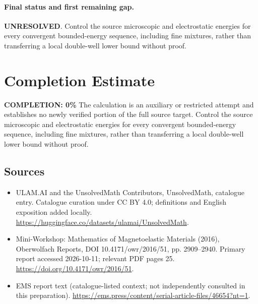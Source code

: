 \documentclass[11pt]{article}
\begin{document}
\paragraph{Final status and first remaining gap.}
\textbf{UNRESOLVED}. Control the source microscopic and electrostatic energies for every convergent bounded-energy sequence, including fine mixtures, rather than transferring a local double-well lower bound without proof.

\section{Completion Estimate}
\noindent\textbf{COMPLETION: 0\%}
The calculation is an auxiliary or restricted attempt and establishes no newly verified portion of the full source target. Control the source microscopic and electrostatic energies for every convergent bounded-energy sequence, including fine mixtures, rather than transferring a local double-well lower bound without proof.

\subsection{Sources}
\begin{itemize}
\item[\hypertarget{source:statement:1}{S1}] ULAM.AI and the UnsolvedMath Contributors, UnsolvedMath, catalogue entry. Catalogue curation under CC BY 4.0; definitions and English exposition added locally.
\url{https://huggingface.co/datasets/ulamai/UnsolvedMath}.
\item[\hypertarget{source:statement:2}{S2}] Mini-Workshop: Mathematics of Magnetoelastic Materials (2016), Oberwolfach Reports, DOI 10.4171/owr/2016/51, pp. 2909--2940. Primary report accessed 2026-10-11; relevant PDF pages 25.
\url{https://doi.org/10.4171/owr/2016/51}.
\item[\hypertarget{source:statement:3}{S3}] EMS report text (catalogue-listed context; not independently consulted in this preparation).
\url{https://ems.press/content/serial-article-files/46654?nt=1}.
\end{itemize}
\label{end:statement}
\end{document}
